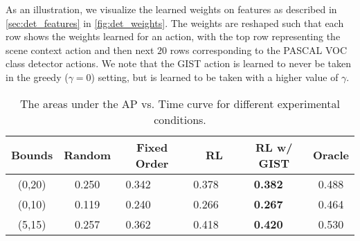 

As an illustration, we visualize the learned weights on features as described in \autoref{sec:det_features} in \autoref{fig:det_weights}.
The weights are reshaped such that each row shows the weights learned for an action, with the top row representing the scene context action and then next $20$ rows corresponding to the PASCAL VOC class detector actions.
We note that the GIST action is learned to never be taken in the greedy ($\gamma=0$) setting, but is learned to be taken with a higher value of $\gamma$.

\begin{table}[t]
\caption{The areas under the AP vs. Time curve for different experimental conditions.}
\label{tab:det_results}
\centering
\begin{tabular}{|c|c|c|c|c|c|}
\hline
Bounds & Random & Fixed Order & RL        & RL w/ GIST         & Oracle \\ \hline
(0,20) & 0.250  & 0.342       & 0.378     & \textbf{0.382}  & 0.488 \\
(0,10) & 0.119  & 0.240       & 0.266     & \textbf{0.267}  & 0.464 \\
(5,15) & 0.257  & 0.362       & 0.418     & \textbf{0.420}  & 0.530 \\ \hline
\end{tabular}
\end{table}
